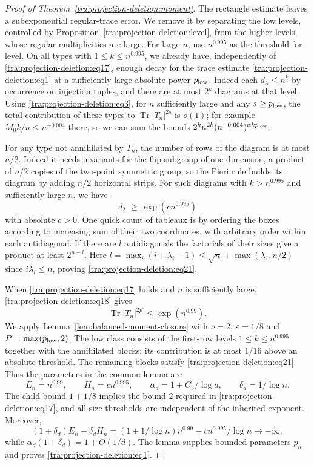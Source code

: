 \begin{proof}[Proof of Theorem~\ref{tra:projection-deletion:moment}]
\label{tra:projection-deletion:moment-induction-and-completion}
The rectangle estimate leaves a subexponential regular-trace error. We remove it by separating the low levels, controlled by Proposition~\ref{tra:projection-deletion:level}, from the higher levels, whose regular multiplicities are large. For large \(n\), use \(n^{0.995}\) as the threshold for level. On all types with \(1\le k\le n^{0.995}\), we already have, independently of \eqref{tra:projection-deletion:eq17}, enough decay for the trace estimate \eqref{tra:projection-deletion:eq1} at a sufficiently large absolute power \(p_{\rm low}\). Indeed each \(d_\lambda\le n^k\) by occurrence on injection tuples, and there are at most \(2^k\) diagrams at that level. Using \eqref{tra:projection-deletion:eq3}, for \(n\) sufficiently large and any \(s\ge p_{\rm low}\), the total contribution of these types to \(\operatorname{Tr}|T_n|^{2s}\) is \(o(1)\); for example \(M_0 k/n\le n^{-0.004}\) there, so we can sum the bounds \(2^k n^{2k} (n^{-0.004})^{\alpha k p_{\rm low}}\).

For any type not annihilated by \(T_n\), the number of rows of the diagram is at most \(n/2\). Indeed it needs invariants for the flip subgroup of one dimension, a product of \(n/2\) copies of the two-point symmetric group, so the Pieri rule builds its diagram by adding \(n/2\) horizontal strips. For such diagrams with \(k> n^{0.995}\) and sufficiently large \(n\), we have
\begin{equation}
d_\lambda\ \ge\ \exp(c n^{0.995})
\label{tra:projection-deletion:eq21}
\end{equation}
with absolute \(c>0\). One quick count of tableaux is by ordering the boxes according to increasing sum of their two coordinates, with arbitrary order within each antidiagonal. If there are \(l\) antidiagonals the factorials of their sizes give a product at least \(2^{n-l}\). Here \(l=\max_i(i+\lambda_i-1)\le\sqrt n+\max(\lambda_1,n/2)\) since \(i\lambda_i\le n\), proving \eqref{tra:projection-deletion:eq21}.

When \eqref{tra:projection-deletion:eq17} holds and \(n\) is sufficiently large, \eqref{tra:projection-deletion:eq18} gives
\[
\operatorname{Tr}|T_n|^{2p'}\le \exp(n^{0.99}).
\]
We apply Lemma~\ref{lem:balanced-moment-closure} with
$\nu=2$, $\varepsilon=1/8$ and $P=\max(p_{\rm low},2)$.
The low class consists of the first-row levels
$1\le k\le n^{0.995}$ together with the annihilated blocks;
its contribution is at most $1/16$ above an absolute threshold.
The remaining blocks satisfy \eqref{tra:projection-deletion:eq21}.
Thus the parameters in the common lemma are
\[
 E_n=n^{0.99},\qquad H_n=c n^{0.995},\qquad
 \alpha_d=1+C_3/\log a,\qquad \delta_d=1/\log n.
\]
The child bound $1+1/8$ implies the bound $2$ required in
\eqref{tra:projection-deletion:eq17}, and all size thresholds are
independent of the inherited exponent. Moreover,
\[
 (1+\delta_d)E_n-\delta_dH_n
 =(1+1/\log n)n^{0.99}-c n^{0.995}/\log n\longrightarrow-\infty,
\]
while $\alpha_d(1+\delta_d)=1+O(1/d)$. The lemma supplies bounded
parameters $p_n$ and proves \eqref{tra:projection-deletion:eq1}.


\end{proof}
